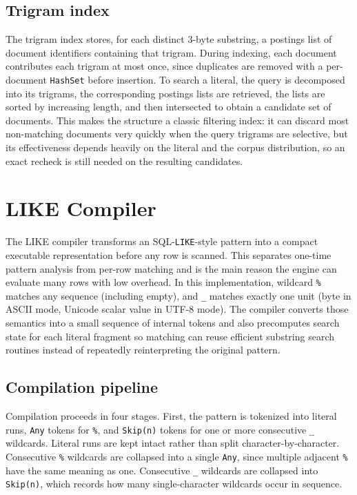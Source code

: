 \documentclass[11pt]{article}
\begin{document}
\subsection{Trigram index}
The trigram index stores, for each distinct 3-byte substring, a postings list of document identifiers containing that trigram. During indexing, each document contributes each trigram at most once, since duplicates are removed with a per-document \verb|HashSet| before insertion. To search a literal, the query is decomposed into its trigrams, the corresponding postings lists are retrieved, the lists are sorted by increasing length, and then intersected to obtain a candidate set of documents. This makes the structure a classic filtering index: it can discard most non-matching documents very quickly when the query trigrams are selective, but its effectiveness depends heavily on the literal and the corpus distribution, so an exact recheck is still needed on the resulting candidates. 

\newpage
\section{LIKE Compiler}

The LIKE compiler transforms an SQL-\texttt{LIKE}-style pattern into a compact executable representation before any row is scanned. This separates one-time pattern analysis from per-row matching and is the main reason the engine can evaluate many rows with low overhead. In this implementation, wildcard \texttt{\%} matches any sequence (including empty), and \texttt{\_} matches exactly one unit (byte in ASCII mode, Unicode scalar value in UTF-8 mode). The compiler converts those semantics into a small sequence of internal tokens and also precomputes search state for each literal fragment so matching can reuse efficient substring search routines instead of repeatedly reinterpreting the original pattern.

\subsection{Compilation pipeline}

Compilation proceeds in four stages. First, the pattern is tokenized into literal runs, \texttt{Any} tokens for \texttt{\%}, and \texttt{Skip(n)} tokens for one or more consecutive \texttt{\_} wildcards. Literal runs are kept intact rather than split character-by-character. Consecutive \texttt{\%} wildcards are collapsed into a single \texttt{Any}, since multiple adjacent \texttt{\%} have the same meaning as one. Consecutive \texttt{\_} wildcards are collapsed into \texttt{Skip(n)}, which records how many single-character wildcards occur in sequence.
\end{document}
